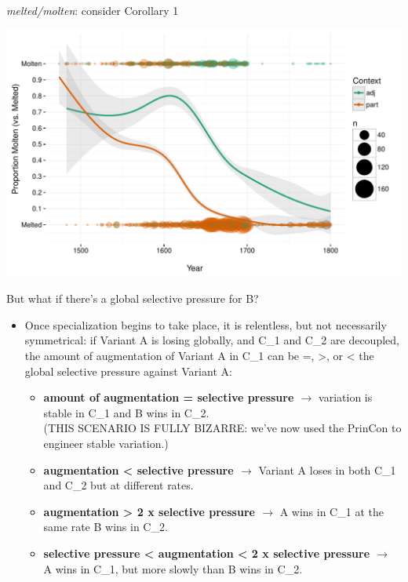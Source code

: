 \documentclass[hyperref={pdfpagelabels=false}]{beamer}
\begin{document}
\begin{frame}{\textsl{melted/molten}: consider Corollary 1}

\includegraphics[width=1.128\textwidth]{FormByDateUnbinnedWithDots2.pdf}
\end{frame}




\begin{frame}{But what if there's a global selective pressure for B?}
		\begin{itemize}
			\item Once specialization begins to take place, it is relentless, but not necessarily symmetrical: if Variant A is losing globally, and C_1 and C_2 are decoupled, the amount of augmentation of Variant A in C_1 can be =, >, or < the global selective pressure against Variant A:			
			\begin{itemize}
					\item \textbf{amount of augmentation = selective pressure $\rightarrow$} variation is stable in C_1 and B wins in C_2.\\(THIS SCENARIO IS FULLY BIZARRE: we've now used the PrinCon to engineer stable variation.)
					\item \textbf{augmentation < selective pressure $\rightarrow$} Variant A loses in both C_1 and C_2 but at different rates.
					\item \textbf{augmentation > 2 x selective pressure $\rightarrow$} A wins in C_1 at the same rate B wins in C_2.
					\item \textbf{selective pressure < augmentation < 2 x selective pressure $\rightarrow$} A wins in C_1, but more slowly than B wins in C_2.			
			\end{itemize}
		\end{itemize}
\end{frame}
\end{document}
